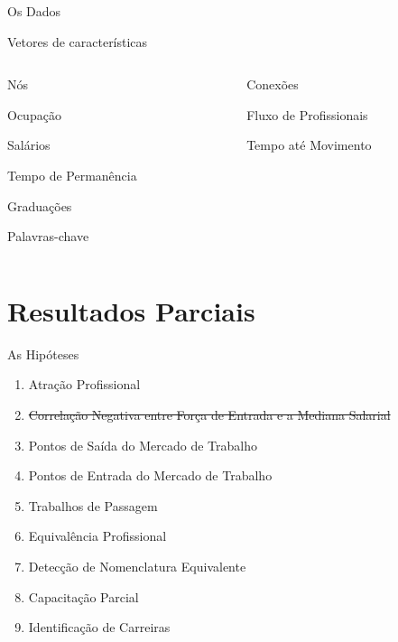 \documentclass[10pt, hyperref={pdfpagelabels=false, unicode=true}, aspectratio=169]{beamer}
\begin{document}
\begin{frame}[label=mapa-dados]{Os Dados}
  \begin{center}
    \Large
    Vetores de características
    
    \vspace{\baselineskip}
    
    \begin{columns}[T,onlytextwidth]
      \begin{column}{0.5\textwidth}
        \centering
        \alert{Nós}

        \large
        Ocupação
        
        Salários
        
        Tempo de Permanência
        
        Graduações
        
        Palavras-chave
      \end{column}
      
      \begin{column}{0.5\textwidth}
        \centering
        \alert{Conexões}

        \large
        Fluxo de Profissionais
          
        Tempo até Movimento
      \end{column}
    \end{columns}
  \end{center}
\end{frame}

\section{Resultados Parciais}

\begin{frame}[label=hipoteses]{As Hipóteses}
  \begin{enumerate}
    \item \alert{Atração Profissional}
    \item \sout{Correlação Negativa entre Força de Entrada e a Mediana Salarial}
    \item \alert{Pontos de Saída do Mercado de Trabalho}
    \item \alert{Pontos de Entrada do Mercado de Trabalho}
    \item Trabalhos de Passagem
    \item Equivalência Profissional 
    \item Detecção de Nomenclatura Equivalente 
    \item \alert{Capacitação Parcial}
    \item \alert{Identificação de Carreiras}
  \end{enumerate}
\end{frame}
\end{document}

